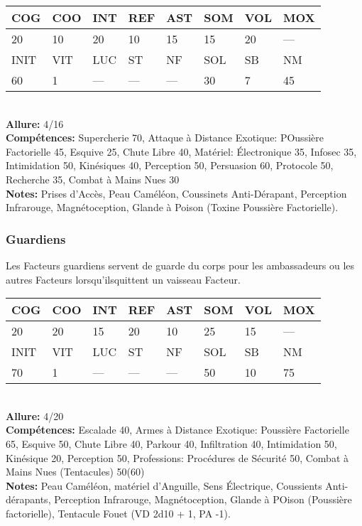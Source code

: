 {\begin{tabular}{|l|l|l|l|l|l|l|l|}
COG &COO &INT &REF &AST &SOM &VOL &MOX \\ \hline

20 &10 &20 &10 &15 &15 &20 &— \\ \hline

INIT &VIT &LUC &ST &NF &SOL &SB &NM \\ \hline

60 &1 &— &— &— &30 &7 &45 \\ \hline

\end{tabular} \\ \textbf{Allure: }4/16 \\ \textbf{Compétences:} Supercherie 70, Attaque à Distance Exotique: POussière Factorielle 45, Esquive 25, Chute Libre 40, Matériel: Électronique 35, Infosec 35, Intimidation 50, Kinésiques 40, Perception 50, Persuasion 60, Protocole 50, Recherche 35, Combat à Mains Nues 30 \\ \textbf{Notes: }Prises d'Accès, Peau Caméléon, Coussinets Anti-Dérapant, Perception Infrarouge, Magnétoception, Glande à Poison (Toxine Poussière Factorielle). 



\subsubsection{Guardiens} 

Les Facteurs guardiens servent de guarde du corps pour les ambassadeurs ou les autres Facteurs lorsqu'ilsquittent un vaisseau Facteur. \\ \begin{tabular}{|l|l|l|l|l|l|l|l|} \hline

COG &COO &INT &REF &AST &SOM &VOL &MOX \\ \hline

20 &20 &15 &20 &10 &25 &15 &— \\ \hline

INIT &VIT &LUC &ST &NF &SOL &SB &NM \\ \hline

70 &1 &— &— &— &50 &10 &75 \\ \hline

\end{tabular} \\ \textbf{Allure: }4/20 \\ \textbf{Compétences:} Escalade 40, Armes à Distance Exotique: Poussière Factorielle 65, Esquive 50, Chute Libre 40, Parkour 40, Infiltration 40, Intimidation 50, Kinésique 20, Perception 50, Professions: Procédures de Sécurité 50, Combat à Mains Nues (Tentacules) 50(60) \\ \textbf{Notes:} Peau Caméléon, matériel d'Anguille, Sens Électrique, Coussients Anti-dérapants, Perception Infrarouge, Magnétoception, Glande à POison (Poussière factorielle), Tentacule Fouet (VD 2d10  + 1, PA -1). 



}
